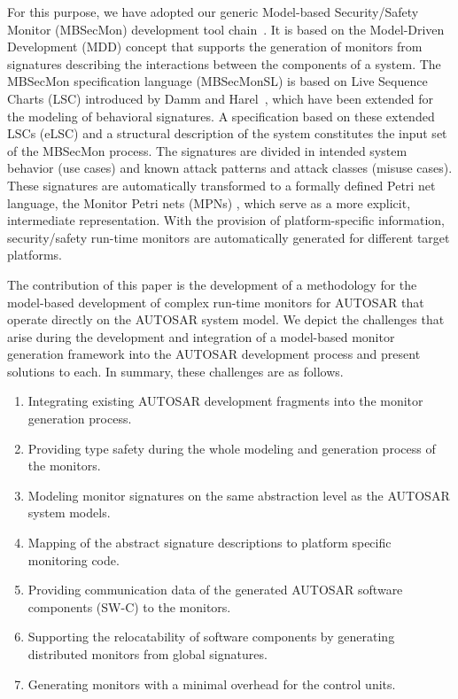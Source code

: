For this purpose, we have adopted our generic Model-based Security/Safety Monitor (MBSecMon) development tool chain~\cite{Patzina2011}. 
It is based on the Model-Driven Development (MDD) concept that supports the generation of monitors from signatures describing the interactions between the components of a system.
The MBSecMon specification language (MBSecMonSL) is based on Live Sequence Charts (LSC) introduced by Damm and Harel~\cite{Damm2001}, which have been extended \cite{Patzina2011} for the modeling of behavioral signatures.
A specification based on these extended LSCs (eLSC) and a structural description of the system constitutes the input set of the MBSecMon process. 
The signatures are divided in intended system behavior (use cases) and known attack patterns and attack classes (misuse cases). 
These signatures are automatically transformed to a formally defined Petri net language, the Monitor Petri nets (MPNs) \cite{Patzina2010}, which serve as a more explicit, intermediate representation.
With the provision of platform-specific information, security/safety run-time monitors are automatically generated for different target platforms.

The contribution of this paper is the development of a methodology for the model-based development of complex run-time monitors for AUTOSAR that operate directly on the AUTOSAR system model.
We depict the challenges that arise during the development and integration of a model-based monitor generation framework into the AUTOSAR development process and present solutions to each.
In summary, these challenges are as follows.
\begin{enumerate}[label=\textbf{C\arabic{enumi}},ref=\arabic{enumi}]
  \item \label{itm:integrationExisting} Integrating existing AUTOSAR development fragments into the monitor generation process. 
  \item \label{itm:datatypesafety} Providing type safety during the whole modeling and generation process of the monitors.
  \item \label{itm:modelling} Modeling monitor signatures on the same abstraction level as the AUTOSAR system models.  
  \item \label{itm:mappingsig} Mapping of the abstract signature descriptions to platform specific monitoring code.
  \item \label{itm:connectingmonitors} Providing communication data of the generated AUTOSAR software components (SW-C) to the monitors. 
  \item \label{itm:relocatability} Supporting the relocatability of software components by generating distributed monitors from global signatures.
  \item \label{itm:minimalOverhead} Generating monitors with a minimal overhead for the control units. 
\end{enumerate}

